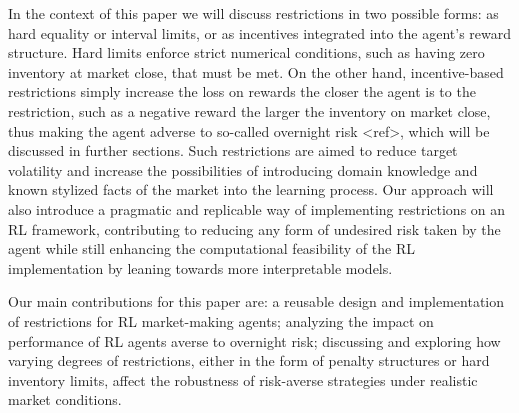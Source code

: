 In the context of this paper we will discuss restrictions in two possible forms: as hard equality or interval limits, or as incentives integrated into the agent's reward structure. Hard limits enforce strict numerical conditions, such as having zero inventory at market close, that must be met. On the other hand, incentive-based restrictions simply increase the loss on rewards the closer the agent is to the restriction, such as a negative reward the larger the inventory on market close, thus making the agent adverse to so-called overnight risk <ref>, which will be discussed in further sections. Such restrictions are aimed to reduce target volatility and increase the possibilities of introducing domain knowledge and known stylized facts of the market into the learning process. Our approach will also introduce a pragmatic and replicable way of implementing restrictions on an RL framework, contributing to reducing any form of undesired risk taken by the agent while still enhancing the computational feasibility of the RL implementation by leaning towards more interpretable models.

Our main contributions for this paper are: a reusable design and implementation of restrictions for RL market-making agents; analyzing the impact on performance of RL agents averse to overnight risk; discussing and exploring how varying degrees of restrictions, either in the form of penalty structures or hard inventory limits, affect the robustness of risk-averse strategies under realistic market conditions.